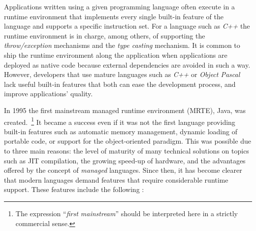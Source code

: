 Applications written using a given programming language often execute in a runtime environment that implements every single built-in feature of the language and supports a specific instruction set.
For a language such as \textit{C++} the runtime environment is in charge, among others, of supporting the \textit{throw/exception} mechanisms and the \textit{type casting} mechanism.
It is common to ship the runtime environment along the application when applications are deployed as native code because external dependencies are avoided in such a way.
However, developers that use mature languages such as \textit{C++} or \textit{Object Pascal} lack useful built-in features that both can ease the development process, and improve applications' quality.

In 1995 the first mainstream managed runtime environment (MRTE), Java, was created.~\footnote{The expression ``\textit{first mainstream}'' should be interpreted here in a strictly commercial sense.}
It became a success even if it was not the first language providing built-in features such as automatic memory management, dynamic loading of portable code, or support for the object-oriented paradigm.
This was possible due to three main reasons: the level of maturity of many technical solutions on topics such as \gls{JIT} compilation, the growing speed-up of hardware, and the advantages offered by the concept of \textit{managed} languages.
Since then, it has become clearer that modern languages demand features that require considerable runtime support.
These features include the following \cite{Cierniak2005}:

%

